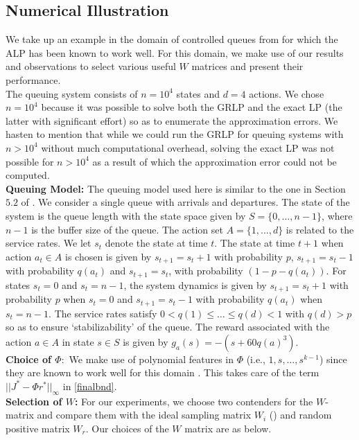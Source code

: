 \subsection{Numerical Illustration}
We take up an example in the domain of controlled queues from \cite{ALP} for which the ALP has been known to work well. For this domain, we make use of our results and observations to select various useful $W$ matrices and present their performance.\\
The queuing system consists of $n=10^4$ states and $d=4$ actions. We chose $n=10^4$ because it was possible to solve both the GRLP and the exact LP (the latter with significant effort) so as to enumerate the approximation errors. We hasten to mention that while we could run the GRLP for queuing systems with $n>10^4$ without much computational overhead, solving the exact LP was not possible for $n>10^4$ as a result of which the approximation error could not be computed.\\
\textbf{Queuing Model:}
The queuing model used here is similar to the one in Section~$5.2$ of \cite{ALP}. We consider a single queue with arrivals and departures. The state of the system is the queue length with the state space given by $S=\{0,\ldots,n-1\}$, where $n-1$ is the buffer size of the queue. The action set $A=\{1,\ldots,d\}$ is related to the service rates. We let $s_t$ denote the state at time $t$. The state at time $t+1$ when action $a_t \in A $ is chosen is given by $s_{t+1}= s_{t}+1$ with probability $p$, $s_{t+1}= s_{t}-1$ with probability $q(a_t)$ and $s_{t+1}= s_t$, with probability $(1-p-q(a_t))$. For states $s_t=0$ and $s_t=n-1$, the system dynamics is given by 	$s_{t+1}= s_{t}+1$ with probability $p$ when $s_t=0$ and $s_{t+1}=s_t-1$ with probability $q(a_t)$ when $s_t=n-1$.
The service rates satisfy $0<q(1)\leq \ldots\leq q(d)<1$ with $q(d)>p$ so as to ensure `stabilizability' of the queue. The reward associated with the action $a \in A$ in state $s\in S$ is given by $g_a(s)=-(s+60q(a)^3)$.\\
\textbf{Choice of $\Phi:$} We make use of polynomial features in $\Phi$ (i.e., $1,s,\ldots,s^{k-1}$) since they are known to work well for this domain \cite{ALP}. This takes care of the term $||J^*-\Phi r^*||_\infty$ in \eqref{finalbnd}. \\
\textbf{Selection of $W$:} For our experiments, we choose two contenders for the $W$-matrix and compare them with the ideal sampling matrix $W_i$ (\cite{CS}) and random positive matrix $W_r$. Our choices of the $W$ matrix are as below.\\
